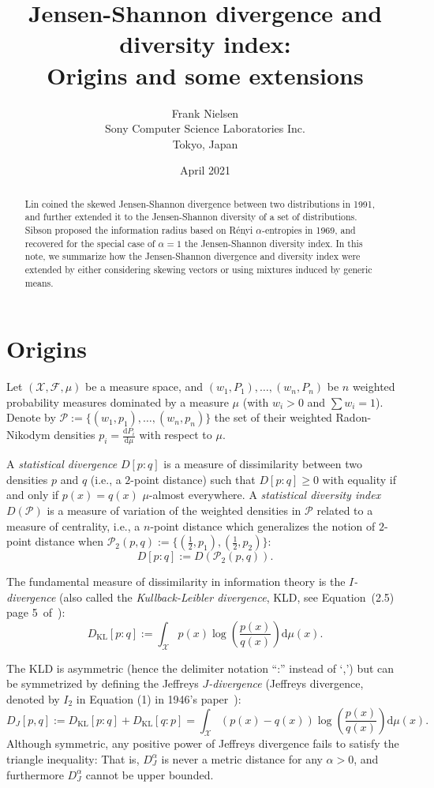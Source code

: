 \documentclass[11pt]{article}
\title{Jensen-Shannon divergence and diversity index:\\ Origins and some extensions}
\author{Frank Nielsen\\ Sony Computer Science Laboratories Inc.\\ Tokyo, Japan}
\date{April 2021}
\def\calX{\mathcal{X}}
\def\calF{\mathcal{F}}
\def\calP{\mathcal{P}}
\def\dmu{\mathrm{d}\mu}
\def\KL{\mathrm{KL}}
\begin{document}
\maketitle

\begin{abstract}
Lin coined the skewed Jensen-Shannon divergence between two distributions in 1991, and further extended it to the Jensen-Shannon diversity of a set of distributions.
Sibson proposed the information radius based on R\'enyi $\alpha$-entropies in 1969, and recovered for the special case of $\alpha=1$ the Jensen-Shannon diversity index. In this note, we summarize how  the Jensen-Shannon divergence and diversity index were extended by either considering skewing vectors or using mixtures induced by generic means.
\end{abstract}

\section{Origins}

Let $(\calX,\calF,\mu)$ be a measure space, and $(w_1,P_1),\ldots, (w_n,P_n)$ be $n$ weighted probability measures dominated 
by a measure $\mu$ (with $w_i>0$ and $\sum w_i=1$). 
Denote by $\calP:=\{(w_1,p_1),\ldots,  (w_n,p_n)\}$ the set of their weighted Radon-Nikodym densities $p_i=\frac{\mathrm{d}P_i}{\dmu}$ with respect to $\mu$.

A {\em statistical divergence} $D[p:q]$ is a measure of dissimilarity between two densities $p$ and $q$ (i.e., a $2$-point distance) such that $D[p:q]\geq 0$ with equality if and only if $p(x)=q(x)$ $\mu$-almost everywhere.
A {\em statistical diversity index} $D(\calP)$ is a measure of variation of the weighted densities in $\calP$ related to a measure of centrality, i.e., a $n$-point distance which generalizes the notion of $2$-point distance when $\calP_2(p,q):=\{(\frac{1}{2},p_1),(\frac{1}{2},p_2)\}$:
$$
D[p:q]:=D(\calP_2(p,q)).
$$

The fundamental measure of dissimilarity in information theory is the {\em $I$-divergence} (also called the {\em Kullback-Leibler divergence}, KLD,  see Equation~(2.5) page 5~of~\citep{Kullback-1997}):
$$
D_\KL[p:q]:=  \int_\calX p(x)\log\left(\frac{p(x)}{q(x)}\right)\dmu(x).
$$

The KLD is asymmetric (hence the delimiter notation ``:'' instead of `,') but can be symmetrized by defining the Jeffreys {\em $J$-divergence} (Jeffreys divergence, denoted by $I_2$ in Equation (1) in 1946's paper~\citep{Jeffreys-1946}):
$$
D_J[p,q] := D_\KL[p:q]+D_\KL[q:p] = \int_\calX (p(x)-q(x))\log\left(\frac{p(x)}{q(x)}\right)\dmu(x).
$$
Although symmetric, any positive power of Jeffreys divergence fails to satisfy the triangle inequality: 
That is, $D_J^\alpha$ is never a metric distance for any $\alpha>0$, and furthermore $D_J^\alpha$  cannot be upper bounded.
\end{document}
